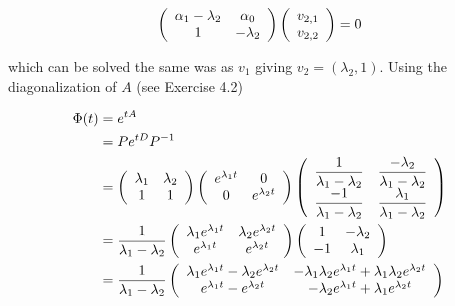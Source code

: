 \documentclass{article}
\numberwithin{questioncounter}{section}
\begin{document}
\begin{solution}
\begin{align*}
\left(\begin{array}{c c} \alpha_{1} - \lambda_{2} & \alpha_{0} \\ 1 & -\lambda_{2} \end{array} \right) \left(\begin{array}{c} v_{2,1} \\ v_{2,2} \end{array} \right) = 0
\end{align*}

which can be solved the same was as $v_{1}$ giving $v_{2} = (\lambda_{2}, 1)$. Using the diagonalization of $A$ (see Exercise 4.2)

\begin{align*}
\Phi(t) &= e^{tA} \\
&= P e^{tD} P^{-1} \\
&= \left(\begin{array}{c c} \lambda_{1} & \lambda_{2} \\ 1 & 1 \end{array} \right) \left(\begin{array}{c c} e^{\lambda_{1} t} & 0  \\ 0 & e^{\lambda_{2}t} \end{array} \right)  \left(\begin{array}{c c} \dfrac{1}{\lambda_{1} - \lambda_{2}} & \dfrac{-\lambda_{2}}{\lambda_{1} - \lambda_{2}} \\ \dfrac{-1}{\lambda_{1} - \lambda_{2}} & \dfrac{\lambda_{1}}{\lambda_{1} - \lambda_{2}} \end{array} \right) \\
&= \dfrac{1}{\lambda_{1} - \lambda_{2}} \left(\begin{array}{c c} \lambda_{1} e^{\lambda_{1} t} & \lambda_{2} e^{\lambda_{2} t} \\ e^{\lambda_{1} t} & e^{\lambda_{2} t} \end{array}\right) \left(\begin{array}{c c} 1 & -\lambda_{2} \\ -1 & \lambda_{1} \end{array} \right) \\
&= \dfrac{1}{\lambda_{1} - \lambda_{2}} \left(\begin{array}{c c} \lambda_{1} e^{\lambda_{1} t} - \lambda_{2} e^{\lambda_{2} t} & -\lambda_{1} \lambda_{2} e^{\lambda_{1} t} + \lambda_{1} \lambda_{2} e^{\lambda_{2} t} \\ e^{\lambda_{1} t} - e^{\lambda_{2} t} & -\lambda_{2} e^{\lambda_{1} t} + \lambda_{1} e^{\lambda_{2} t} \end{array} \right)
\end{align*}

\end{solution}
\end{document}
